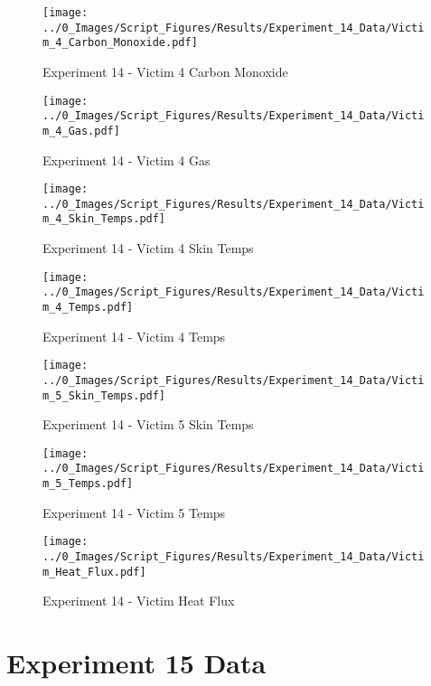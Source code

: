 	\begin{figure}[H]
		\centering
		\texttt{[image: ../0\_Images/Script\_Figures/Results/Experiment\_14\_Data/Victim\_4\_Carbon\_Monoxide.pdf]}
		\caption[]{Experiment 14 - Victim 4 Carbon Monoxide}
	\end{figure}
 
	\clearpage

	\begin{figure}[H]
		\centering
		\texttt{[image: ../0\_Images/Script\_Figures/Results/Experiment\_14\_Data/Victim\_4\_Gas.pdf]}
		\caption[]{Experiment 14 - Victim 4 Gas}
	\end{figure}
 

	\begin{figure}[H]
		\centering
		\texttt{[image: ../0\_Images/Script\_Figures/Results/Experiment\_14\_Data/Victim\_4\_Skin\_Temps.pdf]}
		\caption[]{Experiment 14 - Victim 4 Skin Temps}
	\end{figure}
 
	\clearpage

	\begin{figure}[H]
		\centering
		\texttt{[image: ../0\_Images/Script\_Figures/Results/Experiment\_14\_Data/Victim\_4\_Temps.pdf]}
		\caption[]{Experiment 14 - Victim 4 Temps}
	\end{figure}
 

	\begin{figure}[H]
		\centering
		\texttt{[image: ../0\_Images/Script\_Figures/Results/Experiment\_14\_Data/Victim\_5\_Skin\_Temps.pdf]}
		\caption[]{Experiment 14 - Victim 5 Skin Temps}
	\end{figure}
 
	\clearpage

	\begin{figure}[H]
		\centering
		\texttt{[image: ../0\_Images/Script\_Figures/Results/Experiment\_14\_Data/Victim\_5\_Temps.pdf]}
		\caption[]{Experiment 14 - Victim 5 Temps}
	\end{figure}
 

	\begin{figure}[H]
		\centering
		\texttt{[image: ../0\_Images/Script\_Figures/Results/Experiment\_14\_Data/Victim\_Heat\_Flux.pdf]}
		\caption[]{Experiment 14 - Victim Heat Flux}
	\end{figure}
 
	\clearpage

\clearpage		\large
\section{Experiment 15 Data} \label{App:Exp15Results} 

